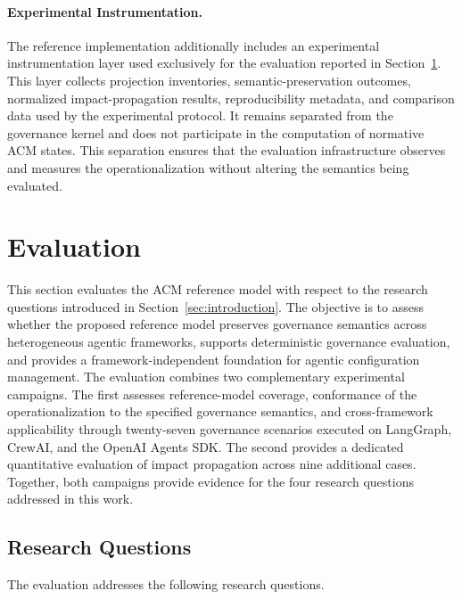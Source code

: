 \documentclass[10pt]{article}
\begin{document}
\paragraph{Experimental Instrumentation.}

The reference implementation additionally includes an experimental instrumentation layer used exclusively for the evaluation reported in Section~\ref{sec:evaluation}. This layer collects projection inventories, semantic-preservation outcomes, normalized impact-propagation results, reproducibility metadata, and comparison data used by the experimental protocol. It remains separated from the governance kernel and does not participate in the computation of normative ACM states. This separation ensures that the evaluation infrastructure observes and measures the operationalization without altering the semantics being evaluated.


\section{Evaluation}
\label{sec:evaluation}

This section evaluates the ACM reference model with respect to the research questions introduced in Section~\ref{sec:introduction}. The objective is to assess whether the proposed reference model preserves governance semantics across heterogeneous agentic frameworks, supports deterministic governance evaluation, and provides a framework-independent foundation for agentic configuration management. The evaluation combines two complementary experimental campaigns. The first assesses reference-model coverage, conformance of the operationalization to the specified governance semantics, and cross-framework applicability through twenty-seven governance scenarios
executed on LangGraph, CrewAI, and the OpenAI Agents SDK. The second provides a dedicated quantitative evaluation of impact propagation across nine additional cases. Together, both campaigns provide evidence for the four research questions addressed in this work.

\subsection{Research Questions}
\label{sec:research_questions}

The evaluation addresses the following research questions.
\end{document}
